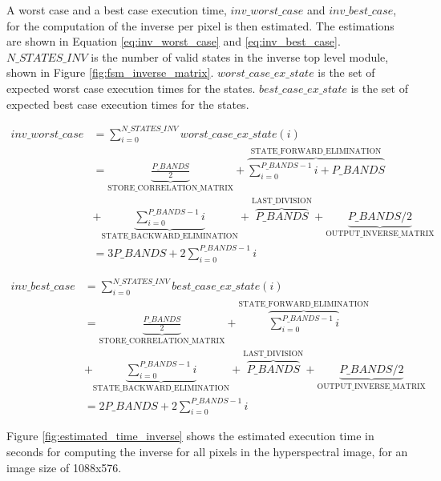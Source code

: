 A worst case and a best case execution time, $inv\_worst\_case$ and $inv\_best\_case$, for the computation of the inverse per pixel is then estimated. The estimations are shown in Equation \ref{eq:inv_worst_case} and \ref{eq:inv_best_case}.$N\_STATES\_INV$ is the number of valid states in the inverse top level module, shown in Figure \ref{fig:fsm_inverse_matrix}. $worst\_case\_ex\_state$ is the set of expected worst case execution times for the states.  $best\_case\_ex\_state$ is the set of expected best case execution times for the states. 

\begin{equation}
\begin{split}
inv\_worst\_case & = \sum_{i=0}^{N\_STATES\_INV}worst\_case\_ex\_state(i) \\
& =\underbrace{\frac{P\_BANDS}{2} }_\text{STORE\_CORRELATION\_MATRIX}  + \overbrace{\sum_{i=0}^{P\_BANDS-1}i + P\_BANDS}^\text{STATE\_FORWARD\_ELIMINATION} \\
& + \underbrace{\sum_{i=0}^{P\_BANDS-1}i}_\text{STATE\_BACKWARD\_ELIMINATION}  
 +
\overbrace{P\_BANDS}^\text{LAST\_DIVISION} + \underbrace{P\_BANDS/2}_\text{OUTPUT\_INVERSE\_MATRIX}\\
& = 3P\_BANDS + 2\sum_{i=0}^{P\_BANDS-1}i
\end{split}
\label{eq:inv_worst_case}
\end{equation}


\begin{equation}
\begin{split}
inv\_best\_case & = \sum_{i=0}^{N\_STATES\_INV}best\_case\_ex\_state(i) \\
& = \underbrace{\frac{P\_BANDS}{2} }_\text{STORE\_CORRELATION\_MATRIX}  + \overbrace{\sum_{i=0}^{P\_BANDS-1}i }^\text{STATE\_FORWARD\_ELIMINATION} \\
& + \underbrace{\sum_{i=0}^{P\_BANDS-1}i}_\text{STATE\_BACKWARD\_ELIMINATION}  
 +
\overbrace{P\_BANDS}^\text{LAST\_DIVISION} + \underbrace{P\_BANDS/2}_\text{OUTPUT\_INVERSE\_MATRIX}\\
& = 2P\_BANDS + 2\sum_{i=0}^{P\_BANDS-1}i
\end{split}
\label{eq:inv_best_case}
\end{equation}

Figure \ref{fig:estimated_time_inverse} shows the estimated execution time in seconds for computing the inverse for all pixels in the hyperspectral image, for an image size of 1088x576. 

